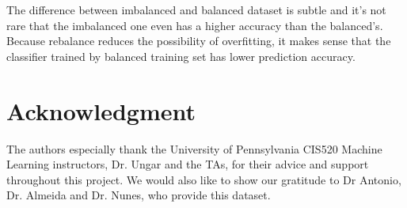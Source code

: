 \documentclass[10pt,twocolumn,letterpaper]{article}
\begin{document}
The difference between imbalanced and balanced dataset is subtle and it's not rare that the imbalanced one even has a higher accuracy than the balanced’s. Because rebalance reduces the possibility of overfitting, it makes sense that the classifier trained by balanced training set has lower prediction accuracy. %

\newpage


{\small


}


\section*{Acknowledgment}
The authors especially thank the University of Pennsylvania CIS520 Machine Learning instructors, Dr. Ungar and the TAs, for their advice and support throughout this project. We would also like to show our gratitude to Dr Antonio, Dr. Almeida and Dr. Nunes, who provide this dataset.
\end{document}
